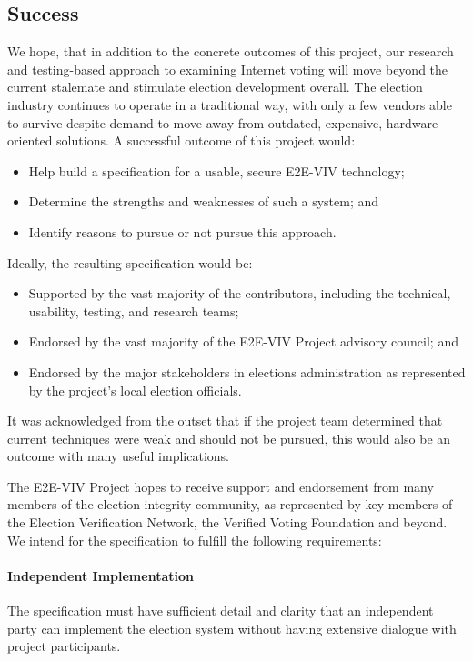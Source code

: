 \subsection*{Success}
\label{sec:success}

We hope, that in addition to the concrete outcomes of this project,
our research and testing-based approach to examining Internet voting
will move beyond the current stalemate and stimulate election
development overall. The election industry continues to operate in a
traditional way, with only a few vendors able to survive despite
demand to move away from outdated, expensive, hardware-oriented
solutions. A successful outcome of this project would:

\begin{itemize}
\item Help build a specification for a usable, secure E2E-VIV technology; 
\item Determine the strengths and weaknesses of such a system; and
\item Identify reasons to pursue or not pursue this approach.
\end{itemize}

Ideally, the resulting specification would be:

\begin{itemize}
\item Supported by the vast majority of the contributors, including
  the technical, usability, testing, and research teams; 
\item Endorsed by the vast majority of the E2E-VIV Project advisory
  council; and  
\item Endorsed by the major stakeholders in elections administration
  as represented by the project’s local election officials. 
\end{itemize}

It was acknowledged from the outset that if the project team
determined that current techniques were weak and should not be
pursued, this would also be an outcome with many useful implications. 

The E2E-VIV Project hopes to receive support and endorsement from many
members of the election integrity community, as represented by key
members of the Election Verification Network, the Verified Voting
Foundation and beyond. We intend for the specification to fulfill the
following requirements:

\paragraph{Independent Implementation}
The specification must have sufficient detail and clarity that an
independent party can implement the election system without having
extensive dialogue with project participants.

